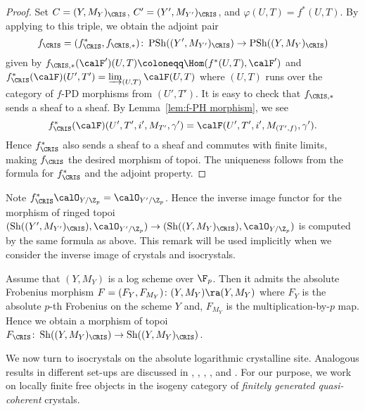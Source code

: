 \begin{proof}
 Set $C=(Y,M_Y)_\CRIS$, $C'=(Y',M_{Y'})_\CRIS$, and $\varphi(U,T)=f^\ast(U,T)$.
By applying \cite[Prop.~5.7]{berthelot-ogus-book} to this triple, we obtain the adjoint pair 
\[
f_\CRIS=(f_\CRIS^\ast,f_{\CRIS,\ast})\colon \operatorname{PSh}((Y',M_{Y'})_\CRIS)\rightarrow\operatorname{PSh}((Y,M_Y)_\CRIS)
\]
given by $f_{\CRIS,\ast}(\calF')(U,T)\coloneqq \Hom(f^\ast(U,T), \calF')$ and 
$f_{\CRIS}^\ast(\calF)(U',T')=\varinjlim_{(U,T)}\calF(U,T)$ where $(U,T)$ runs over the category of $f$-PD morphisms from $(U',T')$.
It is easy to check that $f_{\CRIS,\ast}$ sends a sheaf to a sheaf. By Lemma~\ref{lem:f-PH morphism}, we see 
\[
f_{\CRIS}^\ast(\calF)(U',T',i',M_{T'},\gamma')=\calF(U',T',i',M_{(T',f)},\gamma').
\]
Hence $f_{\CRIS}^\ast$ also sends a sheaf to a sheaf and commutes with finite limits, making $f_\CRIS$ the desired morphism of topoi. The uniqueness follows from the formula for $f_{\CRIS}^\ast$ and the adjoint property.
\end{proof}

Note $f^\ast_\CRIS\calO_{Y/\Z_p}=\calO_{Y'/\Z_p}$. Hence the inverse image functor for the morphism of ringed topoi $(\operatorname{Sh}((Y',M_{Y'})_\CRIS),\calO_{Y'/\Z_p})\rightarrow (\operatorname{Sh}((Y,M_Y)_\CRIS),\calO_{Y/\Z_p})$ is computed by the same formula as above. This remark will be used implicitly when we consider the inverse image of crystals and isocrystals.



\begin{eg}\label{eg:Frobenius pullback on crystalline site}
Assume that $(Y,M_Y)$ is a log scheme over $\F_p$. Then it admits the absolute Frobenius morphism $F=(F_Y,F_{M_Y})\colon (Y,M_Y)\ra (Y,M_Y)$ where $F_Y$ is the absolute $p$-th Frobenius on the scheme $Y$ and, $F_{M_Y}$ is the multiplication-by-$p$ map. Hence we obtain a morphism of topoi $F_\CRIS\colon\operatorname{Sh}((Y,M_Y)_\CRIS)\rightarrow \operatorname{Sh}((Y,M_Y)_\CRIS)$.
\end{eg}


We now turn to isocrystals on the absolute logarithmic crystalline site. Analogous results in different set-ups are discussed in \cite[\S6]{Kato-log}, \cite[\S1.7]{Beilinson-crystalline-period-map}, \cite[\S7]{Ogus-convergenttopos}, \cite[\S4.3]{Shiho-II}, and \cite{drinfeld-stackycrystal}. 
For our purpose, we work on locally finite free objects in the isogeny category of \emph{finitely generated quasi-coherent} crystals. 

